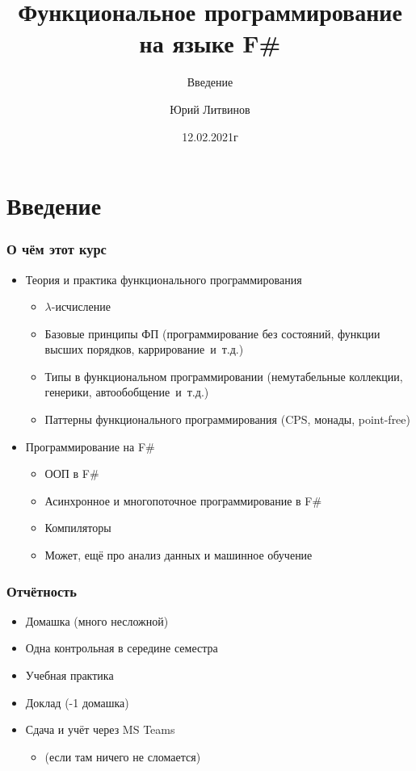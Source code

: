 \documentclass[xetex,mathserif,serif]{beamer}
\title{Функциональное программирование на языке F\#}
\subtitle{Введение}
\author{Юрий Литвинов}
\date{12.02.2021г}
\begin{document}
    
    \frame{\titlepage}
    
    \section{Введение}
    
    \begin{frame}
        \frametitle{О чём этот курс}
        \begin{itemize}
            \item Теория и практика функционального программирования
            \begin{itemize}
                \item $\lambda$-исчисление
                \item Базовые принципы ФП (программирование без состояний, функции высших порядков, каррирование~и~т.д.)
                \item Типы в функциональном программировании (немутабельные коллекции,
                    генерики, автообобщение~и~т.д.)
                \item Паттерны функционального программирования (CPS, монады, point-free)
            \end{itemize}
            \item Программирование на F\# 
            \begin{itemize}
                \item ООП в F\#
                \item Асинхронное и многопоточное программирование в F\#
                \item Компиляторы
                \item Может, ещё про анализ данных и машинное обучение
            \end{itemize}
        \end{itemize}
    \end{frame}

    \begin{frame}
        \frametitle{Отчётность}
        \begin{itemize}
            \item Домашка (много несложной)
            \item Одна контрольная в середине семестра
            \item Учебная практика
            \item Доклад (-1 домашка)
            \item Сдача и учёт через MS Teams 
            \begin{itemize}
                \item (если там ничего не сломается)
            \end{itemize}
        \end{itemize}
    \end{frame}
\end{document}

